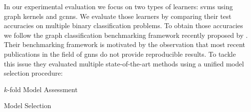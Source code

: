 In our experimental evaluation we focus on two types of learners:
\acp{svm} using graph kernels and \acp{gcnn}.
We evaluate those learners by comparing their test accuracies on multiple binary classification problems.
To obtain those accuracies we follow the graph classification benchmarking framework recently proposed by \citet{Errica2020}.
Their benchmarking framework is motivated by the observation that most recent publications in the field of \acp{gnn} do not provide reproducible results.
To tackle this issue they evaluated multiple state-of-the-art methods using a unified model selection procedure:\\
{\setlength{\intextsep}{0pt}%
\begin{minipage}[t]{0.55\linewidth-1em}
	\begin{algorithm}[H]
		\caption{$k$-fold Model Assessment}\label{algo:eval:assessment}
		\begin{algorithmic}[1]
				\EndFor{}
			\EndFor{}
		\end{algorithmic}
	\end{algorithm}
\end{minipage}\hspace*{1em}%
\begin{minipage}[t]{0.45\linewidth}
	\begin{algorithm}[H]
		\caption{Model Selection}\label{algo:eval:selection}
		\begin{algorithmic}[1]
			\ForAll{$\theta \in \Theta$}
			\EndFor{}
			\EndFunction{}
		\end{algorithmic}
	\end{algorithm}
\end{minipage}}

